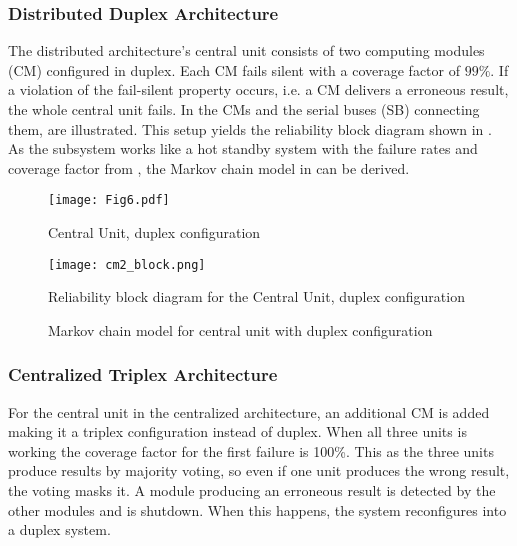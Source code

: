 \subsubsection{Distributed Duplex Architecture}
\label{subsec:dda}
The distributed architecture's central unit consists of two computing modules (CM) configured in duplex. Each CM fails silent with a coverage factor of $99\%$. If a violation of the fail-silent property occurs, i.e. a CM delivers a erroneous result, the whole central unit fails. In  the CMs and the serial buses (SB) connecting them, are illustrated. This setup yields the reliability block diagram shown in . As the subsystem works like a hot standby system with the failure rates and coverage factor from , the Markov chain model in  can be derived.

\begin{figure}[H]
  \centering
  \texttt{[image: Fig6.pdf]}
  \caption{Central Unit, duplex configuration }
  \label{fig6}
\end{figure}
\begin{figure}[H]
  \centering
  \texttt{[image: cm2\_block.png]}
  \caption{Reliability block diagram for the Central Unit, duplex configuration}
  \label{fig7}
\end{figure}
\begin{figure}[H]
  \begin{center}
  \caption{Markov chain model for central unit with duplex configuration}
   \label{fig8}
\end{center}
\end{figure}



\subsubsection{Centralized Triplex Architecture}
\label{subsec:cta}
For the central unit in the centralized architecture, an additional CM is added making it a triplex configuration instead of duplex. When all three units is working the coverage factor for the first failure is 100\%. This as the three units produce results by majority voting, so even if one unit produces the wrong result, the voting masks it. A module producing an erroneous result is detected by the other modules and is shutdown. When this happens, the system reconfigures into a duplex system. 


